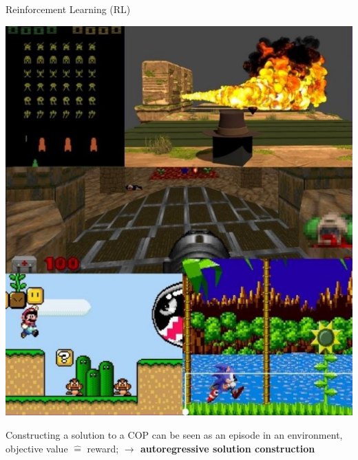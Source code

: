 \documentclass[aspectratio=1610]{beamer}
\newcommand{\important}[1]{{\color{green!60!black}#1}}
\renewcommand{\footnotesize}{\scriptsize}
\begin{document}
\begin{frame}{Reinforcement Learning (RL)}
\begin{itemize}
\begin{minipage}[c]{0.20\textwidth}
				\includegraphics[width=\linewidth]{graphics/compgames.jpg}
			\end{minipage}

		\vspace{2ex}
		\important{Constructing a solution to a COP can be seen as an episode in an environment, objective value $\hat=$ reward;
		\textbf{$\rightarrow$ autoregressive solution construction}}
	\end{itemize}
\end{frame}





		
\end{document}
